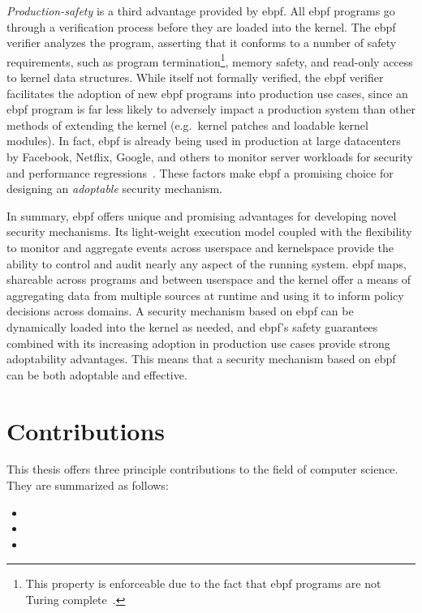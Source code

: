 \textit{Production-safety} is a third advantage provided by \gls{ebpf}. All \gls{ebpf} programs go
through a verification process before they are loaded into the kernel. The \gls{ebpf} verifier
analyzes the program, asserting that it conforms to a number of safety requirements, such
as program termination\footnote{This property is enforceable due to the fact that \gls{ebpf}
programs are not Turing complete~\cite{gregg2019_bpf}.}, memory safety, and read-only
access to kernel data structures. While itself not formally verified, the \gls{ebpf} verifier
facilitates the adoption of new \gls{ebpf} programs into production use cases, since an \gls{ebpf}
program is far less likely to adversely impact a production system than other methods of
extending the kernel (e.g.~kernel patches and loadable kernel modules). In fact, \gls{ebpf} is
already being used in production at large datacenters by Facebook, Netflix, Google, and
others to monitor server workloads for security and performance
regressions~\cite{gregg2019_bpf}. These factors make \gls{ebpf} a promising choice for
designing an \textit{adoptable} security mechanism.

In summary, \gls{ebpf} offers unique and promising advantages for developing novel security
mechanisms. Its light-weight execution model coupled with the flexibility to monitor and
aggregate events across userspace and kernelspace provide the ability to control and audit
nearly any aspect of the running system. \gls{ebpf} maps, shareable across programs and between
userspace and the kernel offer a means of aggregating data from multiple sources at
runtime and using it to inform policy decisions across domains. A security mechanism based
on \gls{ebpf} can be dynamically loaded into the kernel as needed, and \gls{ebpf}'s safety guarantees
combined with its increasing adoption in production use cases provide strong adoptability
advantages. This means that a security mechanism based on \gls{ebpf} can be both adoptable and
effective.


\section{Contributions}%
\label{s:contributions}

This thesis offers three principle contributions to the field of computer science.
They are summarized as follows:
\begin{itemize}
  \item {}
  \item {}
  \item {}
\end{itemize}

